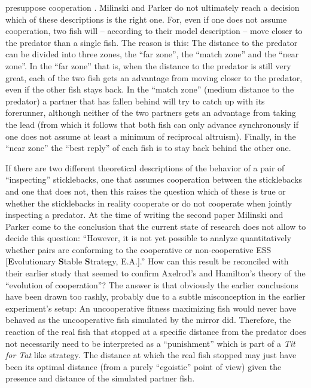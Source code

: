 presuppose cooperation \cite[p.\  1242-1245]{milinski-parker:1997}. Milinski
and Parker do not ultimately reach a decision which of these descriptions is
the right one. For, even if one does not assume cooperation, two fish will
-- according to their model description -- move closer to the predator than a
single fish. The reason is this: The distance to the predator can be divided
into three zones, the ``far zone'', the ``match zone'' and the ``near zone''.
In the ``far zone'' that is, when the distance to the predator is still very
great, each of the two fish gets an advantage from moving closer to the
predator, even if the other fish stays back. In the ``match zone'' (medium
distance to the predator) a partner that has fallen behind will try to catch
up with its forerunner, although neither of the two partners gets an advantage
from taking the lead (from which it follows that both fish can only advance
synchronously if one does not assume at least a minimum of reciprocal
altruism). Finally, in the ``near zone'' the ``best reply'' of each fish is to
stay back behind the other one.

If there are two different theoretical descriptions of the behavior of a pair
of ``inspecting'' sticklebacks, one that assumes cooperation between the
sticklebacks and one that does not, then this raises the question which of
these is true or whether the sticklebacks in reality cooperate or do not
cooperate when jointly inspecting a predator. At the time of writing the
second paper Milinski and Parker come to the conclusion that the current state
of research does not allow to decide this question: ``However, it is not yet
possible to analyze quantitatively whether pairs are conforming to the
cooperative or non-cooperative ESS [{\bf E}volutionary {\bf S}table {\bf
S}trategy, E.A.].'' \cite[p.\ 1245]{milinski-parker:1997} How
can this result be reconciled with their earlier study that seemed to confirm
Axelrod's and Hamilton's theory of the ``evolution of cooperation''? The
answer is that obviously the earlier conclusions have been drawn too rashly,
probably due to a subtle misconception in the earlier experiment's setup: An
uncooperative fitness maximizing fish would never have behaved as the
uncooperative fish simulated by the mirror did. Therefore, the reaction of the
real fish that stopped at a specific distance from the predator does not
necessarily need to be interpreted as a ``punishment'' which is part of a {\em
  Tit for Tat} like strategy. The distance at which the real fish stopped may
just have been its optimal distance (from a purely ``egoistic'' point of view)
given the presence and distance of the simulated partner fish.

